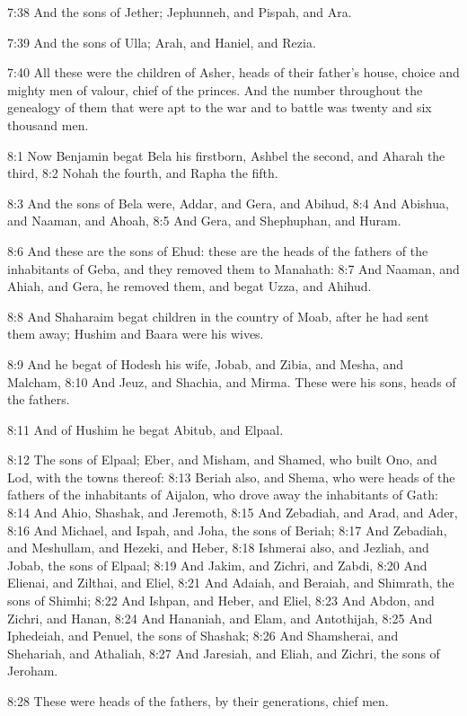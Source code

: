 7:38 And the sons of Jether; Jephunneh, and Pispah, and Ara.

7:39 And the sons of Ulla; Arah, and Haniel, and Rezia.

7:40 All these were the children of Asher, heads of their father's house, choice and mighty men of valour, chief of the princes. And the number throughout the genealogy of them that were apt to the war and to battle was twenty and six thousand men.

8:1 Now Benjamin begat Bela his firstborn, Ashbel the second, and Aharah the third, 8:2 Nohah the fourth, and Rapha the fifth.

8:3 And the sons of Bela were, Addar, and Gera, and Abihud, 8:4 And Abishua, and Naaman, and Ahoah, 8:5 And Gera, and Shephuphan, and Huram.

8:6 And these are the sons of Ehud: these are the heads of the fathers of the inhabitants of Geba, and they removed them to Manahath: 8:7 And Naaman, and Ahiah, and Gera, he removed them, and begat Uzza, and Ahihud.

8:8 And Shaharaim begat children in the country of Moab, after he had sent them away; Hushim and Baara were his wives.

8:9 And he begat of Hodesh his wife, Jobab, and Zibia, and Mesha, and Malcham, 8:10 And Jeuz, and Shachia, and Mirma. These were his sons, heads of the fathers.

8:11 And of Hushim he begat Abitub, and Elpaal.

8:12 The sons of Elpaal; Eber, and Misham, and Shamed, who built Ono, and Lod, with the towns thereof: 8:13 Beriah also, and Shema, who were heads of the fathers of the inhabitants of Aijalon, who drove away the inhabitants of Gath: 8:14 And Ahio, Shashak, and Jeremoth, 8:15 And Zebadiah, and Arad, and Ader, 8:16 And Michael, and Ispah, and Joha, the sons of Beriah; 8:17 And Zebadiah, and Meshullam, and Hezeki, and Heber, 8:18 Ishmerai also, and Jezliah, and Jobab, the sons of Elpaal; 8:19 And Jakim, and Zichri, and Zabdi, 8:20 And Elienai, and Zilthai, and Eliel, 8:21 And Adaiah, and Beraiah, and Shimrath, the sons of Shimhi; 8:22 And Ishpan, and Heber, and Eliel, 8:23 And Abdon, and Zichri, and Hanan, 8:24 And Hananiah, and Elam, and Antothijah, 8:25 And Iphedeiah, and Penuel, the sons of Shashak; 8:26 And Shamsherai, and Shehariah, and Athaliah, 8:27 And Jaresiah, and Eliah, and Zichri, the sons of Jeroham.

8:28 These were heads of the fathers, by their generations, chief men.

